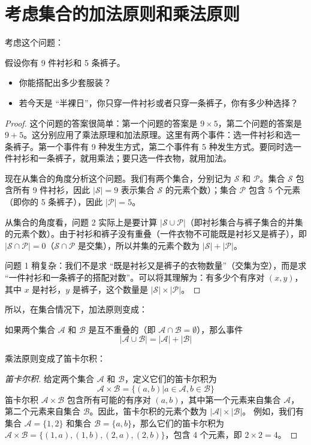 \documentclass[lang=cn,math=mtpro2,11pt,scheme=chinese,pad]{elegantbook}
\begin{document}
\section{考虑集合的加法原则和乘法原则}

考虑这个问题：
\begin{example}
  假设你有 9 件衬衫和 5 条裤子。
  \begin{itemize}
    \item 你能搭配出多少套服装？
    \item 若今天是 “半裸日”，你只穿一件衬衫或者只穿一条裤子，你有多少种选择？
  \end{itemize}
\end{example}
\begin{proof}
  这个问题的答案很简单：第一个问题的答案是 \(9 \times 5\)，第二个问题的答案是 \(9+5\)。这分别应用了乘法原理和加法原理。这里有两个事件：选一件衬衫和选一条裤子。第一个事件有 9 种发生方式，第二个事件有 5 种发生方式。要同时选一件衬衫和一条裤子，就用乘法；要只选一件衣物，就用加法。

  现在从集合的角度分析这个问题。我们有两个集合，分别记为 \(\mathcal{S}\) 和 \(\mathcal{P}\)。集合 \(\mathcal{S}\) 包含所有 9 件衬衫，因此 \(\left| \mathcal{S} \right| = 9\) 表示集合 \(\mathcal{S}\) 的元素个数）；集合 \(\mathcal{P}\) 包含 5 个元素（即你的 5 条裤子），因此 \(\left| \mathcal{P} \right| = 5\)。

  从集合的角度看，问题 2 实际上是要计算 \(\left| \mathcal{S} \cup \mathcal{P} \right|\)（即衬衫集合与裤子集合的并集的元素个数）。由于衬衫和裤子没有重叠（一件衣物不可能既是衬衫又是裤子），即 \(\left| \mathcal{S} \cap \mathcal{P} \right| = 0\)（\(\mathcal{S} \cap \mathcal{P}\) 是交集），所以并集的元素个数为 \(\left| \mathcal{S} \right| + \left| \mathcal{P} \right|\)。

问题 1 稍复杂：我们不是求 “既是衬衫又是裤子的衣物数量”（交集为空），而是求 “一件衬衫和一条裤子的搭配对数”。可以将其理解为：有多少个有序对 \((x,y)\)，其中 \(x\) 是衬衫，\(y\) 是裤子，这个数量是 \(\left| \mathcal{S} \right| \times \left| \mathcal{P} \right|\)。
\end{proof}

所以，在集合情况下，加法原则变成：
\begin{theorem}[（集合）加法原则]
  如果两个集合 \(\mathcal{A}\) 和 \(\mathcal{B}\) 是互不重叠的（即 \(\mathcal{A} \cap \mathcal{B} = \emptyset\)），那么事件
  \[
  |\mathcal{A} \cup \mathcal{B}| = |\mathcal{A}| + |\mathcal{B}|
  \]
\end{theorem}

乘法原则变成了笛卡尔积：
\begin{proof}[笛卡尔积]
  给定两个集合 \(\mathcal{A}\) 和 \(\mathcal{B}\)，定义它们的笛卡尔积为
  \[
    \mathcal{A} \times \mathcal{B} = \{(a,b) | a \in \mathcal{A}, b \in \mathcal{B} \}
  \]
  笛卡尔积 \(\mathcal{A} \times \mathcal{B}\) 包含所有可能的有序对 \((a,b)\)，其中第一个元素来自集合 \(\mathcal{A}\)，第二个元素来自集合 \(\mathcal{B}\)。因此，笛卡尔积的元素个数为 \(|\mathcal{A}| \times |\mathcal{B}|\)。
  例如，我们有集合 \(\mathcal{A}= \{1, 2\}\) 和集合 \(\mathcal{B}= \{a, b\}\)，那么它们的笛卡尔积为 \(\mathcal{A} \times \mathcal{B} = \{(1,a), (1,b), (2,a), (2,b)\}\)，包含 4 个元素，即 \(2 \times 2 = 4\)。
\end{proof}
\end{document}
